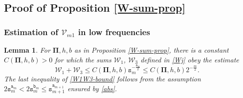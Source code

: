 \documentclass[12pt, twoside]{article}
\newtheorem{lemma}[theorem]{Lemma}
\theoremstyle{definition}
\numberwithin{equation}{section}
\begin{document}
 \subsection{Proof of Proposition \ref{W-sum-prop}} \label{W-sum-prop-proof-section} 
\subsubsection{Estimation of $\mathcal{V}_{m1}$ in low frequencies} 
\begin{lemma}
For $\pmb{\Pi}, h, b$ as in Proposition \ref{W-sum-prop}, there is a constant $C(\pmb{\Pi}, h, b) > 0$ for which the sums $\mathcal W_1$, $\mathcal W_3$ defined in \eqref{Wj} obey the estimate
\begin{equation} \label{W1W3-bound} 
\mathcal W_1 + \mathcal W_3 \leq C(\pmb{\Pi}, h, b) \mathtt s_m^{-\frac{\mathtt a_m}{2}} \leq C(\pmb{\Pi}, h, b) 2^{-\frac{m}{2}}.
\end{equation} 
The last inequality of \eqref{W1W3-bound} follows from the assumption $2\mathtt s_m^{\mathtt a_m} < 2\mathtt s_m^{\mathtt b_m} \leq \mathtt s_{m+1}^{\mathtt a_{m+1}}$ ensured by \eqref{abs}.
\end{lemma} 
\end{document}
